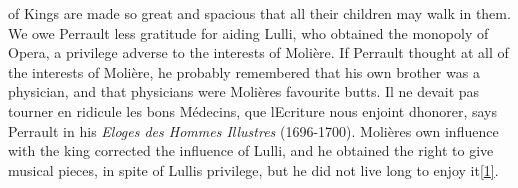 \documentclass[14pt,a4paper]{memoir}
\begin{document}
of Kings are made so great and spacious that all their children may walk
in them.\textquotesingle{} We owe Perrault less gratitude for aiding
Lulli, who obtained the monopoly of Opera, a privilege adverse to the
interests of Molière. If Perrault thought at all of the interests of
Molière, he probably remembered that his own brother was a physician,
and that physicians were Molière\textquotesingle s favourite butts.
\textquotesingle Il ne devait pas tourner en ridicule les bons Médecins,
que l\textquotesingle Ecriture nous enjoint
d\textquotesingle honorer,\textquotesingle{} says Perrault in his
\emph{Eloges des Hommes Illustres} (1696-1700).
Molière\textquotesingle s own influence with the king corrected the
influence of Lulli, and he obtained the right to give musical pieces, in
spite of Lulli\textquotesingle s privilege, but he did not live long to
enjoy
it\protect\hypertarget{4533318093929944247_33931-h-0.htm.xhtmlux5cux23FNanchor_1}{}{}\protect\hyperlink{4533318093929944247_33931-h-0.htm.xhtmlux5cux23Footnote_1}{{{[}1{]}}}.
\end{document}
